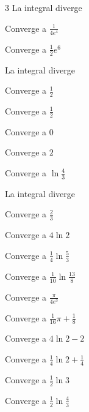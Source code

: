 \begin{multicols}{3}
   {La integral diverge}

   {Converge a $\frac{1}{4e^{4}}$}

   {Converge a $\frac{1}{2}e^{6}$}

   {La integral diverge}

   {Converge a $\frac{1}{2}$}

   {Converge a $\frac{1}{2}$}

   {Converge a $0$}

   {Converge a $2$}

   {Converge a $\ln \frac{4}{3}$}

   {La integral diverge}

   {Converge a $\frac{2}{3}$}

   {Converge a $4\ln 2$}

   {Converge a $\frac{1}{4}\ln \frac{5}{3}$}

   {Converge a $\frac{1}{10}\ln \frac{13}{8}$}

   {Converge a $\frac{\pi }{4e^{3}}$}

   {Converge a $\frac{1}{16}\pi +\frac{1}{8}$}

   {Converge a $4\ln 2 -2$}

   {Converge a $\frac{1}{4}\ln 2+\frac{1}{4}$}

   {Converge a $\frac{1}{2}\ln 3$}

   {Converge a $\frac{1}{2}\ln \frac{4}{3}$}


\end{multicols}
